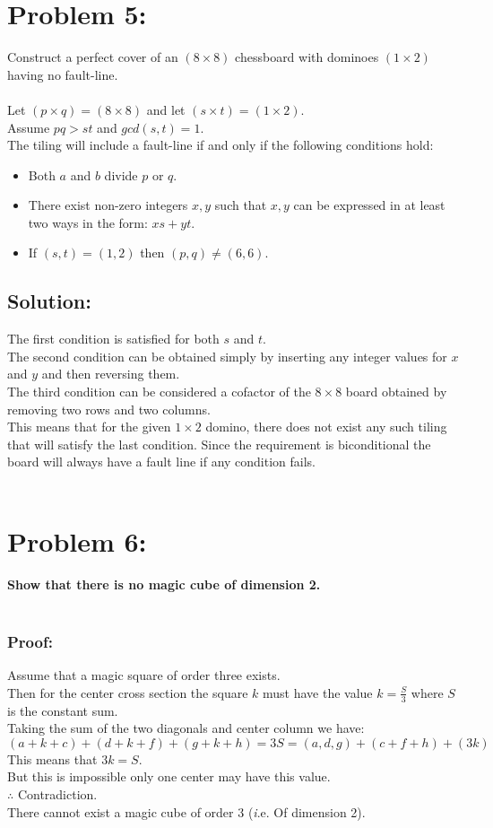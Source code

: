 \documentclass{article}
\begin{document}
\section*{Problem 5: }
Construct a perfect cover of an $(8 \times 8)$ chessboard with dominoes $(1 \times 2)$ having no fault-line.
\\ \\
Let $(p \times q) = (8 \times 8)$ and let $(s \times t) = (1 \times 2)$.\\
Assume $pq > st$ and $gcd(s,t)=1$. \\ 
The tiling will include a fault-line if and only if the following conditions hold: 
\begin{itemize}
    \item Both $a$ and $b$ divide $p$ or $q$. 
    \item There exist non-zero integers $x,y$ such that $x,y$ can be expressed in at least two ways in the form: $xs+yt$. 
    \item If $(s,t) = (1,2)$ then $(p,q) \neq (6,6)$.
\end{itemize}

\subsection*{Solution: }
The first condition is satisfied for both $s$ and $t$.\\
The second condition can be obtained simply by inserting any integer values for $x$ and $y$ and then reversing them. \\
The third condition can be considered a cofactor of the $8 \times 8$ board obtained by removing two rows and two columns. \\
This means that for the given $1 \times 2$ domino, there does not exist any such tiling that will satisfy the last condition. Since the requirement is biconditional the board will always have a fault line if any condition fails. \\ \\

\section*{Problem 6: }
\textbf{Show that there is no magic cube of dimension 2.}\\ \\
\subsubsection*{Proof: }
Assume that a magic square of order three exists. \\
Then for the center cross section the square $k$ must have the value $k = \frac{S}{3}$ where $S$ is the constant sum. \\
Taking the sum of the two diagonals and center column we have: $$(a+k+c)+(d+k+f)+(g+k+h) = 3S = (a,d,g)+(c+f+h)+(3k) $$
This means that $3k = S$. \\
But this is impossible only one center may have this value. \\
$\therefore$ Contradiction. \\
There cannot exist a magic cube of order 3 (\textit i.e. Of dimension 2).
\end{document}

